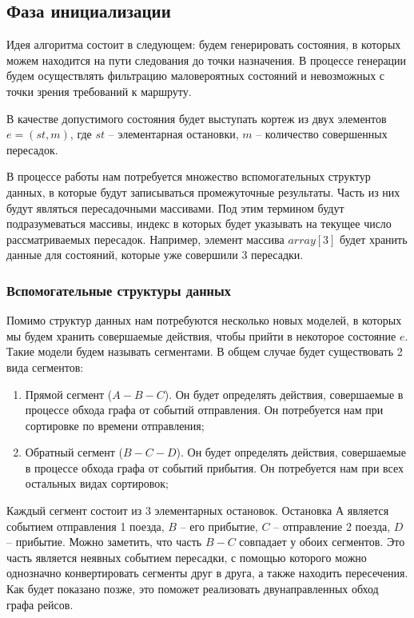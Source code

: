 \subsection{Фаза инициализации}
Идея алгоритма состоит в следующем: будем генерировать состояния, в которых можем находится на пути следования до точки назначения. В процессе генерации будем осуществлять фильтрацию маловероятных состояний и невозможных с точки зрения требований к маршруту.

В качестве допустимого состояния будет выступать кортеж из двух элементов $e=(st, m)$, где $st$ -- элементарная остановки, $m$ -- количество совершенных пересадок. 

В процессе работы нам потребуется множество вспомогательных структур данных, в которые будут записываться промежуточные результаты. Часть из них будут являться пересадочными массивами. Под этим термином будут подразумеваться массивы, индекс в которых будет указывать на текущее число рассматриваемых пересадок. Например, элемент массива $array[3]$ будет хранить данные для состояний, которые уже совершили 3 пересадки.

\subsubsection{Вспомогательные структуры данных}
Помимо структур данных нам потребуются несколько новых моделей, в которых мы будем хранить совершаемые действия, чтобы прийти в некоторое состояние $e$. Такие модели будем называть сегментами. В общем случае будет существовать 2 вида сегментов:
\begin{enumerate}
	\item Прямой сегмент ($A-B-C$). Он будет определять действия, совершаемые в процессе обхода графа от событий отправления. Он потребуется нам при сортировке по времени отправления;
	\item Обратный сегмент ($B-C-D$). Он будет определять действия, совершаемые в процессе обхода графа от событий прибытия. Он потребуется нам при всех остальных видах сортировок;
\end{enumerate}

Каждый сегмент состоит из 3 элементарных остановок. Остановка $А$ является событием отправления 1 поезда, $B$ -- его прибытие, $C$ -- отправление 2 поезда, $D$ -- прибытие. Можно заметить, что часть $B-C$ совпадает у обоих сегментов. Это часть является неявных событием пересадки, с помощью которого можно однозначно конвертировать сегменты друг в друга, а также находить пересечения. Как будет показано позже, это поможет реализовать двунаправленных обход графа рейсов. 

